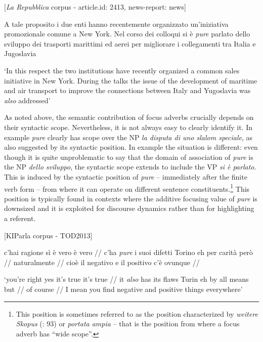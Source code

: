 \ea%
    \label{ex:key:16}

          [\textit{La Repubblica} corpus - article.id: 2413, news-report: news]

A tale proposito i due enti hanno recentemente organizzato un’iniziativa promozionale comune a New York. Nel corso dei colloqui si è \textit{pure} parlato dello sviluppo dei trasporti marittimi ed aerei per migliorare i collegamenti tra Italia e Jugoslavia

\glt ‘In this respect the two institutions have recently organized a common sales initiative in New York. During the talks the issue of the development of maritime and air transport to improve the connections between Italy and Yugoslavia was \textit{also} addressed’
    \z

As noted above, the semantic contribution of focus adverbs crucially depends on their syntactic scope. Nevertheless, it is not always easy to clearly identify it. In example  \textit{pure} clearly has scope over the NP \textit{la disputa di uno slalom speciale}, as also suggested by its syntactic position. In example  the situation is different: even though it is quite unproblematic to say that the domain of association of \textit{pure} is the NP \textit{dello sviluppo}, the syntactic scope extends to include the VP \textit{si è parlato}. This is induced by the syntactic position of \textit{pure} – immediately after the finite verb form – from where it can operate on different sentence constituents.\footnote{This position is sometimes referred to as the position characterized by \textit{weitere Skopus} (\citealt{DimrothKlein1996}: 93) or \textit{portata ampia} \citep[51]{Andorno2000} – that is the position from where a focus adverb has “wide scope”.} This position is typically found in contexts where the additive focusing value of \textit{pure} is downsized and it is exploited for discourse dynamics rather than for highlighting a referent.

\ea%
    \label{ex:key:17}

          [KIParla corpus - TOD2013]

c’hai ragione sì è vero è vero // c’ha \textit{pure} i suoi difetti Torino eh per carità però // naturalmente // cioè il negativo e il positivo c’è ovunque //

\glt ‘you’re right yes it’s true it’s true // it \textit{also} has its flaws Turin eh by all means but // of course // I mean you find negative and positive things everywhere’
    \z

